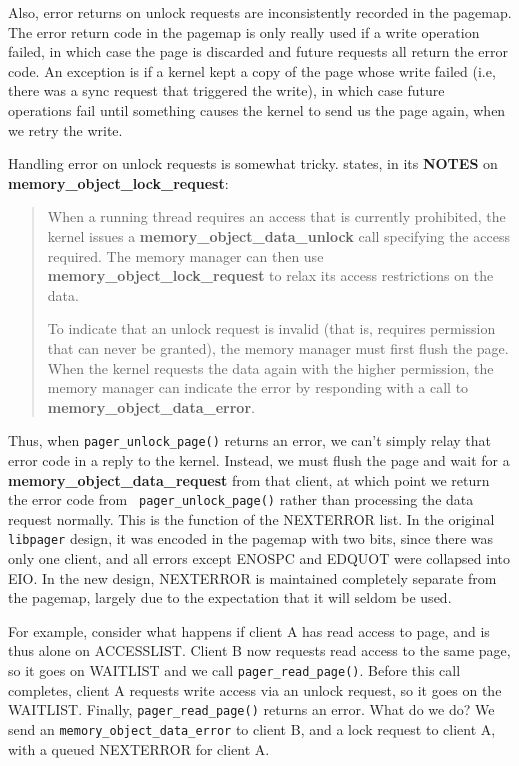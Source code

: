 \documentclass{article}
\def\libpager{{\tt libpager}\xspace}
\def\pagerreadpage{{\tt pager_read_page()}\xspace}
\def\modataerror{{\tt memory_object_data_error}\xspace}
\begin{document}
Also, error returns on unlock requests are inconsistently recorded in
the pagemap.  The error return code in the pagemap is only really used
if a write operation failed, in which case the page is discarded and
future requests all return the error code.  An exception is if a
kernel kept a copy of the page whose write failed (i.e, there was a
sync request that triggered the write), in which case future
operations fail until something causes the kernel to send us the page
again, when we retry the write.

Handling error on unlock requests is somewhat tricky.
\cite{interfaces} states, in its {\bf NOTES} on {\bf
  memory_object_lock_request}:

\begin{quote}
When a running thread requires an access that is currently prohibited,
the kernel issues a {\bf memory_object_data_unlock} call specifying
the access required. The memory manager can then use {\bf
  memory_object_lock_request} to relax its access restrictions on the
data.

To indicate that an unlock request is invalid (that is, requires
permission that can never be granted), the memory manager must first
flush the page. When the kernel requests the data again with the
higher permission, the memory manager can indicate the error by
responding with a call to {\bf memory_object_data_error}.
\end{quote}

Thus, when {\tt pager_unlock_page()} returns an error, we can't simply
relay that error code in a reply to the kernel.  Instead, we must
flush the page and wait for a {\bf memory_object_data_request} from
that client, at which point we return the error code from {\tt
  pager_unlock_page()} rather than processing the data request
normally.  This is the function of the NEXTERROR list.  In the
original \libpager design, it was encoded in the pagemap with two
bits, since there was only one client, and all errors except ENOSPC
and EDQUOT were collapsed into EIO.  In the new design, NEXTERROR is
maintained completely separate from the pagemap, largely due to the
expectation that it will seldom be used.

For example, consider what happens if client A has read access to
page, and is thus alone on ACCESSLIST.  Client B now requests read
access to the same page, so it goes on WAITLIST and we
call \pagerreadpage.  Before this call completes, client A requests
write access via an unlock request, so it goes on the WAITLIST.
Finally, \pagerreadpage returns an error.  What do we do?
We send an \modataerror to client B, and a lock request to
client A, with a queued NEXTERROR for client A.
\end{document}
